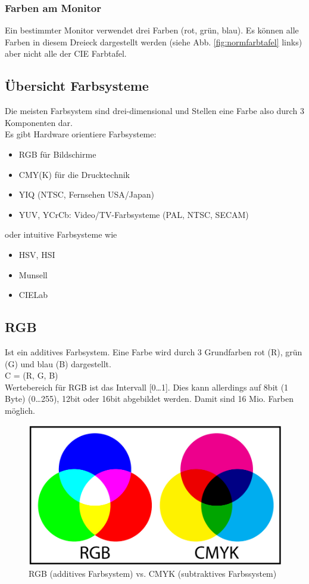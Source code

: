 \subsubsection{Farben am Monitor}
Ein bestimmter Monitor verwendet drei Farben (rot, grün, blau). Es können alle Farben in diesem Dreieck dargestellt werden (siehe Abb. \ref{fig:normfarbtafel} links) aber nicht alle der CIE Farbtafel. 


\subsection{Übersicht Farbsysteme}
Die meisten Farbsystem sind drei-dimensional und Stellen eine Farbe also durch 3 Komponenten dar.\\
Es gibt Hardware orientiere Farbsysteme:
\begin{itemize}[leftmargin=1cm]
    \item RGB für Bildschirme
    \item CMY(K) für die Drucktechnik
    \item YIQ (NTSC, Fernsehen USA/Japan)
    \item YUV, YCrCb: Video/TV-Farbsysteme (PAL, NTSC, SECAM)
\end{itemize}
\noindent
oder intuitive Farbsysteme wie
\begin{itemize}[leftmargin=1cm]
    \item HSV, HSI
    \item Munsell
    \item CIELab
\end{itemize}




\subsection{RGB} 
Ist ein additives Farbsystem. Eine Farbe wird durch 3 Grundfarben rot (R), grün (G) und blau (B) dargestellt. \\
C = (R, G, B)\\
Wertebereich für RGB ist das Intervall [0\dots1]. Dies kann allerdings auf 8bit (1 Byte) (0\dots255), 12bit oder 16bit abgebildet werden. Damit sind 16 Mio. Farben möglich.
\begin{figure}[!ht]
\centering
\includegraphics[width=0.7\linewidth]{fig/RGBvCMYK}
\caption{RGB (additives Farbsystem) vs. CMYK (subtraktives Farbssystem)}
\label{fig:rgbundcmyk}
\end{figure}
